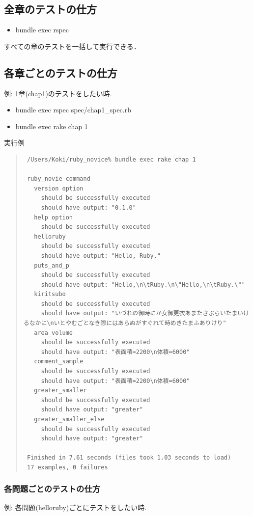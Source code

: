 \subsection{全章のテストの仕方}
\begin{itemize}
\item bundle exec rspec
\end{itemize}
すべての章のテストを一括して実行できる．

\subsection{各章ごとのテストの仕方}
例: 1章(chap1)のテストをしたい時.

\begin{itemize}
\item bundle exec rspec spec/chap1\_spec.rb
\end{itemize}
\begin{itemize}
\item bundle exec rake chap 1
\end{itemize}
実行例
\begin{quote}\begin{verbatim}
 /Users/Koki/ruby_novice% bundle exec rake chap 1   
 
 ruby_novie command
   version option
     should be successfully executed
     should have output: "0.1.0"
   help option
     should be successfully executed
   helloruby
     should be successfully executed
     should have output: "Hello, Ruby."
   puts_and_p
     should be successfully executed
     should have output: "Hello,\n\tRuby.\n\"Hello,\n\tRuby.\""
   kiritsubo
     should be successfully executed
     should have output: "いづれの御時にか女御更衣あまたさぶらいたまいけるなかに\nいとやむごとなき際にはあらぬがすぐれて時めきたまふありけり"
   area_volume
     should be successfully executed
     should have output: "表面積=2200\n体積=6000"
   comment_sample
     should be successfully executed
     should have output: "表面積=2200\n体積=6000"
   greater_smaller
     should be successfully executed
     should have output: "greater"
   greater_smaller_else
     should be successfully executed
     should have output: "greater"
		 
 Finished in 7.61 seconds (files took 1.03 seconds to load)
 17 examples, 0 failures
\end{verbatim}\end{quote}
\subsubsection{各問題ごとのテストの仕方}
例: 各問題(helloruby)ごとにテストをしたい時.

